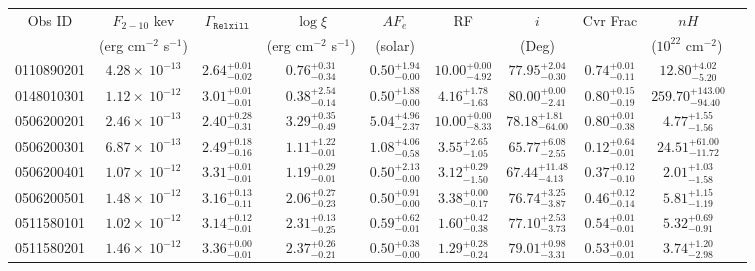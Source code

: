 \documentclass{article}
\begin{document}
\begin{landscape}
\begin{longtable}{cccccccccl}
\hline \multicolumn{1}{c}{Obs ID} & \multicolumn{1}{c}{$F_{2-10}$ kev} & \multicolumn{1}{c}{$\Gamma_\texttt{Relxill}$} & \multicolumn{1}{c}{$\log \xi$} & \multicolumn{1}{c}{$AF_e$} & \multicolumn{1}{c}{RF} & \multicolumn{1}{c}{$\textit{i}$} & \multicolumn{1}{c}{Cvr Frac} & \multicolumn{1}{c}{$nH$}\\  
\multicolumn{1}{c}{} & \multicolumn{1}{c}{(erg cm$^{-2}$ s$^{-1}$)} & \multicolumn{1}{c}{} & \multicolumn{1}{c}{(erg cm$^{-2}$ s$^{-1}$)} & \multicolumn{1}{c}{(solar)} & \multicolumn{1}{c}{} & \multicolumn{1}{c}{(Deg)} & \multicolumn{1}{c}{} & \multicolumn{1}{l}{($10^{22}$ cm$^{-2}$)}\\ \hline 
0110890201 & $4.28 \times~10^{-13}$ & $2.64^{+0.01}_{-0.02}$ & $0.76^{+0.31}_{-0.34}$ & $0.50^{+1.94}_{-0.00}$ & $10.00^{+0.00}_{-4.92}$ & $77.95^{+2.04}_{-0.30}$ &  $0.74^{+0.01}_{-0.11}$ & $12.80^{+4.02}_{-5.20}$ \\
0148010301 & $1.12 \times~10^{-12}$ & $3.01^{+0.01}_{-0.01}$ & $0.38^{+2.54}_{-0.14}$ & $0.50^{+1.88}_{-0.00}$ & $4.16^{+1.78}_{-1.63}$ & $80.00^{+0.00}_{-2.41}$ &  $0.80^{+0.15}_{-0.19}$ & $259.70^{+143.00}_{-94.40}$  \\
0506200201 & $2.46 \times~10^{-13}$ & $2.40^{+0.28}_{-0.31}$ & $3.29^{+0.35}_{-0.49}$ & $5.04^{+4.96}_{-2.37}$ & $10.00^{+0.00}_{-8.33}$ & $78.18^{+1.81}_{-64.00}$ &  $0.80^{+0.01}_{-0.38}$ & $4.77^{+1.55}_{-1.56}$\\
0506200301 & $6.87 \times~10^{-13}$ & $2.49^{+0.18}_{-0.16}$ & $1.11^{+1.22}_{-0.01}$ & $1.08^{+4.06}_{-0.58}$ & $3.55^{+2.65}_{-1.05}$ & $65.77^{+6.08}_{-2.55}$ &  $0.12^{+0.64}_{-0.01}$ & $24.51^{+61.00}_{-11.72}$\\ 
0506200401 & $1.07 \times~10^{-12}$ & $3.31^{+0.01}_{-0.01}$ & $1.19^{+0.29}_{-0.01}$ & $0.50^{+2.13}_{-0.00}$ & $3.12^{+0.29}_{-1.50}$ & $67.44^{+11.48}_{-4.13}$ &  $0.37^{+0.12}_{-0.10}$ & $2.01^{+1.03}_{-1.58}$ \\ 
0506200501 & $1.48 \times~10^{-12}$ & $3.16^{+0.13}_{-0.11}$ & $2.06^{+0.27}_{-0.23}$ & $0.50^{+0.91}_{-0.00}$ & $3.38^{+0.00}_{-0.17}$ & $76.74^{+3.25}_{-3.87}$ &  $0.46^{+0.12}_{-0.14}$ & $5.81^{+1.15}_{-1.19}$ \\ 
0511580101 & $1.02 \times~10^{-12}$ & $3.14^{+0.12}_{-0.01}$ & $2.31^{+0.13}_{-0.25}$ & $0.59^{+0.62}_{-0.01}$ & $1.60^{+0.42}_{-0.38}$ & $77.10^{+2.53}_{-3.73}$ &  $0.54^{+0.01}_{-0.01}$ & $5.32^{+0.69}_{-0.91}$   \\ 
0511580201 & $1.46 \times~10^{-12}$ & $3.36^{+0.00}_{-0.01}$ & $2.37^{+0.26}_{-0.21}$ & $0.50^{+0.38}_{-0.00}$ & $1.29^{+0.28}_{-0.24}$ & $79.01^{+0.98}_{-3.31}$ &  $0.53^{+0.01}_{-0.01}$ & $3.74^{+1.20}_{-2.98}$\\ 

\end{longtable}
\end{landscape}
\end{document}
